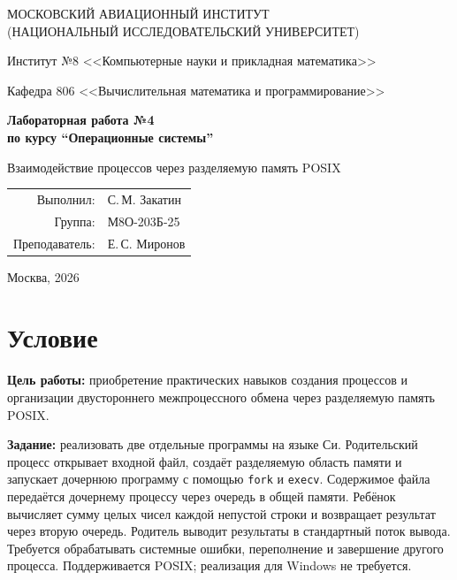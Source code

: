 \documentclass[12pt,a4paper,oneside,fleqn]{article}
\begin{document}
\begin{titlepage}
\begin{center}\large
МОСКОВСКИЙ АВИАЦИОННЫЙ ИНСТИТУТ\\
(НАЦИОНАЛЬНЫЙ ИССЛЕДОВАТЕЛЬСКИЙ УНИВЕРСИТЕТ)
\vspace{20pt}

Институт №8 <<Компьютерные науки и прикладная математика>>

Кафедра 806 <<Вычислительная математика и программирование>>
\end{center}
\vspace{60pt}
\begin{center}\bfseries\large
Лабораторная работа №4\\по курсу \enquote{Операционные системы}
\vspace{30pt}

Взаимодействие процессов через разделяемую память POSIX
\end{center}
\vfill
\begin{flushright}\large
\begin{tabular}{rl}
Выполнил: & С.\,М. Закатин\\
Группа: & М8О-203Б-25\\
Преподаватель: & Е.\,С. Миронов\\
\end{tabular}
\end{flushright}
\vspace{92pt}
\begin{center}\large Москва, 2026\end{center}
\end{titlepage}

\section{Условие}
\textbf{Цель работы:} приобретение практических навыков создания процессов и
организации двустороннего межпроцессного обмена через разделяемую память POSIX.

\textbf{Задание:} реализовать две отдельные программы на языке Си. Родительский
процесс открывает входной файл, создаёт разделяемую область памяти и запускает
дочернюю программу с помощью \texttt{fork} и \texttt{execv}. Содержимое файла
передаётся дочернему процессу через очередь в общей памяти. Ребёнок вычисляет
сумму целых чисел каждой непустой строки и возвращает результат через вторую
очередь. Родитель выводит результаты в стандартный поток вывода. Требуется
обрабатывать системные ошибки, переполнение и завершение другого процесса.
Поддерживается POSIX; реализация для Windows не требуется.
\end{document}
